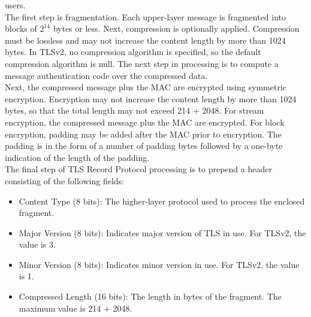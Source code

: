\documentclass[12pt]{article}
\begin{document}
 users.\\
 The first step is fragmentation. Each upper-layer message is fragmented into blocks of  $2^{14}$ bytes or less. Next, compression is optionally applied. Compression must be lossless and may not increase the content length by more than 1024 bytes. In TLSv2, no compression algorithm is specified, so the default compression algorithm is
 null. The next step in processing is to compute a message authentication code over the compressed data.\\
 Next, the compressed message plus the MAC are encrypted using symmetric encryption. Encryption may not increase the content length by more than 1024 bytes, so that the total length may not exceed 214 + 2048. For stream encryption, the compressed message plus the MAC are encrypted. For block encryption, padding may be added after the MAC prior to encryption. The padding is in the form of a number of padding bytes followed by a one-byte indication of the length of the padding.\\
 The final step of TLS Record Protocol processing is to prepend a header consisting of the following fields:
 \begin{itemize}
 	\item Content Type (8 bits): The higher-layer protocol used to process the enclosed fragment.
 	\item Major Version (8 bits): Indicates major version of TLS in use. For TLSv2, the value is 3.
 	\item Minor Version (8 bits): Indicates minor version in use. For TLSv2, the value is 1.
 	\item Compressed Length (16 bits): The length in bytes of the fragment. The maximum value is 214 + 2048.
 \end{itemize}
\end{document}
